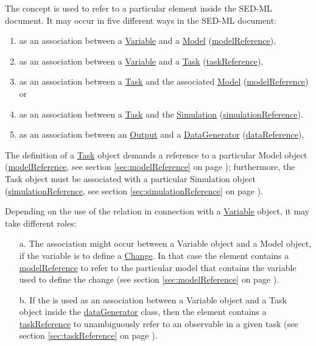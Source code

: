 \label{sec:reference}

The  concept is used to refer to a particular element inside the SED-ML document. It may occur in five different ways in the SED-ML document:
%
\begin{enumerate}
\item{as an association between a \hyperref[class:variable]{Variable} and a \hyperref[class:model]{Model} (\hyperref[sec:modelReference]{modelReference}),}
\item{as an association between a \hyperref[class:variable]{Variable} and a \hyperref[class:task]{Task} (\hyperref[sec:taskReference]{taskReference}),}
\item{as an association between a \hyperref[class:task]{Task} and the associated \hyperref[class:model]{Model} (\hyperref[sec:modelReference]{modelReference}) or}
\item{as an association between a \hyperref[class:task]{Task} and the \hyperref[class:simulation]{Simulation} (\hyperref[sec:simulationReference]{simulationReference}).}
\item{as an association between an \hyperref[class:output]{Output} and a \hyperref[class:dataGenerator]{DataGenerator} (\hyperref[sec:dataReference]{dataReference}),}
\end{enumerate}
%
The definition of a \hyperref[class:task]{Task} object demands a reference to a particular Model object (\hyperref[sec:modelReference]{modelReference}, see section \ref{sec:modelReference} on page \pageref{sec:modelReference}); furthermore, the Task object must be associated with a particular Simulation object (\hyperref[sec:simulationReference]{simulationReference}, see section \ref{sec:simulationReference} on page \pageref{sec:simulationReference}).

Depending on the use of the  relation in connection with a \hyperref[class:variable]{Variable} object, it may take different roles: 
\begin{enumerate}
\item[a.]{The  association might occur between a Variable object and a Model object, if the variable is to define a \hyperref[class:change]{Change}. 
In that case the  element contains a \hyperref[sec:modelReference]{modelReference} to refer to the particular model that contains the variable used to define the change (see section \ref{sec:modelReference} on page \pageref{sec:modelReference}). }
\item[b.]{If the  is used as an association between a Variable object and a Task object  inside the \hyperref[class:dataGenerator]{dataGenerator} class, then the  element contains a \hyperref[sec:taskReference]{taskReference} to unambiguously refer to an observable in a given task (see section \ref{sec:taskReference} on page \pageref{sec:taskReference}).}
\end{enumerate}

